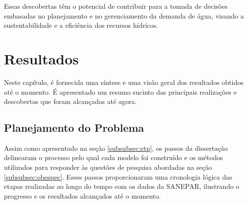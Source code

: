 Essas descobertas têm o potencial de contribuir para a tomada de decisões embasadas no planejamento e no gerenciamento da demanda de água, visando a sustentabilidade e a eficiência dos recursos hídricos.

\section{Resultados} \label{sec:result}

Neste capítulo, é fornecida uma síntese e uma visão geral dos resultados obtidos até o momento. É apresentado um resumo sucinto das principais realizações e descobertas que foram alcançadas até agora.


\subsection{Planejamento do Problema} \label{subsec:planexp}

Assim como apresentado na seção \ref{subsubsec:etp}, os passos da dissertação delinearam o processo pelo qual cada modelo foi construído e os métodos utilizados para responder às questões de pesquisa abordadas na seção \ref{subsubsec:obespec}. Esses passos proporcionaram uma cronologia lógica das etapas realizadas ao longo do tempo com os dados da SANEPAR, ilustrando o progresso e os resultados alcançados até o momento.


















  

 


